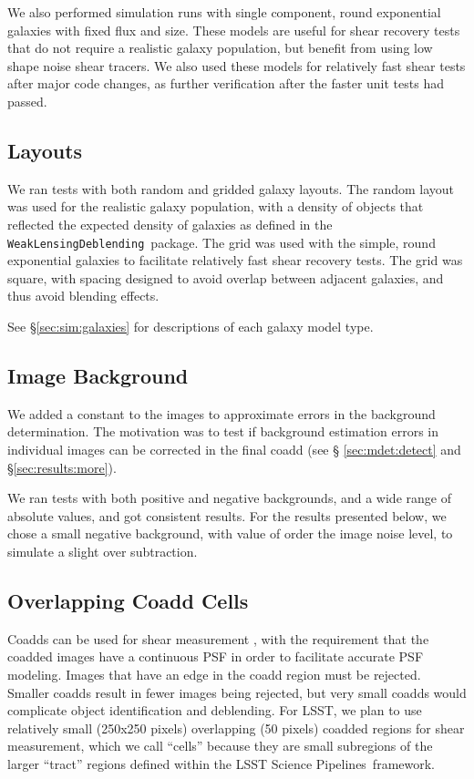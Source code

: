 \documentclass[twocolumn,twocolappendix,astrosym]{openjournal}
\newcommand{\descwl}{\texttt{WeakLensingDeblending}}
\newcommand{\dm}{LSST Science Pipelines}
\begin{document}
We also performed simulation runs with single component, round exponential
galaxies with fixed flux and size.  These models are useful for shear recovery
tests that do not require a realistic galaxy population, but benefit from using
low shape noise shear tracers.  We also used these models for relatively fast
shear tests after major code changes, as further verification after the faster
unit tests had passed.

\subsection{Layouts} \label{sec:sim:layouts}

We ran tests with both random and gridded galaxy layouts.  The random layout
was used for the realistic galaxy population, with a density of objects that
reflected the expected density of galaxies as defined in the \descwl\ package.
The grid was used with the simple, round exponential galaxies to facilitate
relatively fast shear recovery tests.  The grid was square, with spacing
designed to avoid overlap between adjacent galaxies, and thus avoid blending
effects.

See \S \ref{sec:sim:galaxies} for descriptions of each galaxy model type.

\subsection{Image Background} \label{sec:sim:bgerr}

We added a constant to the images to approximate errors in the background
determination.  The motivation was to test if background estimation errors in
individual images can be corrected in the final coadd (see \S
\ref{sec:mdet:detect} and \S \ref{sec:results:more}).

We ran tests with both positive and negative backgrounds, and a wide range of
absolute values, and got consistent results.  For the results presented below,
we chose a small negative background, with value of order the image noise
level, to simulate a slight over subtraction.

\subsection{Overlapping Coadd Cells} \label{sec:sim:cells}

Coadds can be used for shear measurement \citep{ArmstrongCoadd}, with the
requirement that the coadded images have a continuous PSF in order to
facilitate accurate PSF modeling.  Images that have an edge in the coadd region
must be rejected.  Smaller coadds result in fewer images being rejected, but
very small coadds would complicate object identification and deblending.  For
LSST, we plan to use relatively small (250x250 pixels) overlapping (50 pixels)
coadded regions for shear measurement, which we call ``cells'' because they are
small subregions of the larger ``tract'' regions defined within the \dm\
framework.
\end{document}
